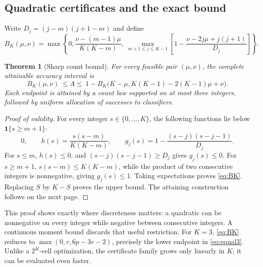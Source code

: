 \documentclass{article}
\newtheorem{theorem}{Theorem}
\newcommand{\ind}{\mathbf 1}
\begin{document}
\subsection{Quadratic certificates and the exact bound}
Write $D_j=(j-m)(j+1-m)$ and define
\begin{equation}\label{eq:BK}
 B_K(\mu,\nu)=\max\left\{0,\frac{\nu-(m-1)\mu}{K(K-m)},\
 \max_{m+1\le j\le K-1}\left[1-\frac{\nu-2j\mu+j(j+1)}{D_j}\right]\right\}.
\end{equation}
\begin{theorem}[Sharp count bound]\label{thm:count}
For every feasible pair $(\mu,\nu)$, the complete attainable accuracy interval is
\begin{equation}\label{eq:countinterval}
 B_K(\mu,\nu)\ \le A\le\
 1-B_K\bigl(K-\mu,K(K-1)-2(K-1)\mu+\nu\bigr).
\end{equation}
Each endpoint is attained by a count law supported on at most three integers, followed by uniform allocation of successes to classifiers.
\end{theorem}
\begin{proof}[Proof of validity]
For every integer $s\in\{0,\ldots,K\}$, the following functions lie below $\ind\{s\ge m+1\}$:
\begin{equation}\label{eq:polynomials}
 0,\qquad h(s)=\frac{s(s-m)}{K(K-m)},\qquad
 g_j(s)=1-\frac{(s-j)(s-j-1)}{D_j}.
\end{equation}
For $s\le m$, $h(s)\le0$, and $(s-j)(s-j-1)\ge D_j$ gives $g_j(s)\le0$. For $s\ge m+1$, $s(s-m)\le K(K-m)$, while the product of two consecutive integers is nonnegative, giving $g_j(s)\le1$. Taking expectations proves \eqref{eq:BK}. Replacing $S$ by $K-S$ proves the upper bound. The attaining construction follows on the next page.
\end{proof}

This proof shows exactly where discreteness matters: a quadratic can be nonnegative on every integer while negative between consecutive integers. A continuous moment bound discards that useful restriction. For $K=3$, \eqref{eq:BK} reduces to $\max(0,r,6p-3r-2)$, precisely the lower endpoint in \eqref{eq:equal3}. Unlike a $2^K$-cell optimization, the certificate family grows only linearly in $K$; it can be evaluated even faster.

\clearpage
\end{document}
